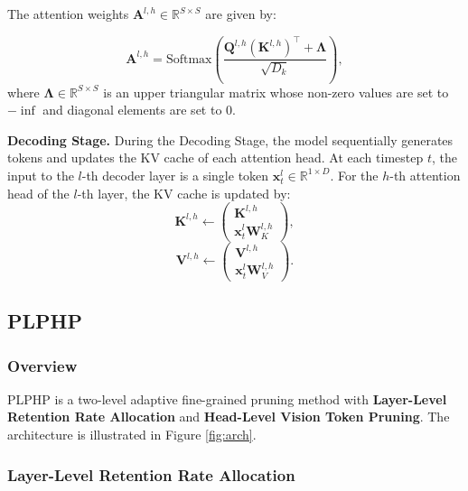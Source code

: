 The attention weights $\mathbf{A}^{l,h} \in \mathbb{R}^{S\times S}$ are given by:

\vspace{-0.3cm}
\begin{equation}
    \mathbf{A}^{l,h} = \text{Softmax}\left(\frac{\mathbf{Q}^{l,h}\left(\mathbf{K}^{l,h}\right)^\top + \mathbf{\Lambda}}{\sqrt{D_k}}\right),
\end{equation}
where $\mathbf{\Lambda} \in \mathbb{R}^{S \times S}$ is an upper triangular matrix whose non-zero values are set to $-\inf$ and diagonal elements are set to $0$.


\noindent \textbf{Decoding Stage.} During the Decoding Stage, the model sequentially generates tokens and updates the KV cache of each attention head. At each timestep $t$, the input to the $l$-th decoder layer is a single token $\mathbf{x}^{l}_t \in \mathbb{R}^{1\times D}$. For the $h$-th attention head of the $l$-th layer, the KV cache is updated by:
\begin{equation}
    \mathbf{K}^{l,h} \leftarrow \begin{pmatrix} \mathbf{K}^{l,h} \\ \mathbf{x}^l_t\mathbf{W}^{l,h}_K\end{pmatrix},
\end{equation}
\begin{equation}
    \mathbf{V}^{l,h} \leftarrow \begin{pmatrix} \mathbf{V}^{l,h} \\ \mathbf{x}^l_t\mathbf{W}^{l,h}_V \end{pmatrix}. 
\end{equation}


\subsection{PLPHP}

\subsubsection{Overview}

PLPHP is a two-level adaptive fine-grained pruning method with \textbf{Layer-Level Retention Rate Allocation} and \textbf{Head-Level Vision Token Pruning}. The architecture is illustrated in Figure \ref{fig:arch}.

\subsubsection{Layer-Level Retention Rate Allocation}

